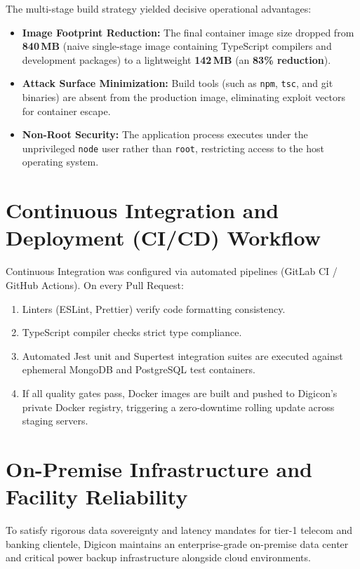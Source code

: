 The multi-stage build strategy yielded decisive operational advantages:
\begin{itemize}
    \item \textbf{Image Footprint Reduction:} The final container image size dropped from \textbf{840\,MB} (naive single-stage image containing TypeScript compilers and development packages) to a lightweight \textbf{142\,MB} (an \textbf{83\% reduction}).
    \item \textbf{Attack Surface Minimization:} Build tools (such as \texttt{npm}, \texttt{tsc}, and git binaries) are absent from the production image, eliminating exploit vectors for container escape.
    \item \textbf{Non-Root Security:} The application process executes under the unprivileged \texttt{node} user rather than \texttt{root}, restricting access to the host operating system.
\end{itemize}

\section{Continuous Integration and Deployment (CI/CD) Workflow}
\label{sec:test_cicd}

Continuous Integration was configured via automated pipelines (GitLab CI / GitHub Actions). On every Pull Request:
\begin{enumerate}
    \item Linters (ESLint, Prettier) verify code formatting consistency.
    \item TypeScript compiler checks strict type compliance.
    \item Automated Jest unit and Supertest integration suites are executed against ephemeral MongoDB and PostgreSQL test containers.
    \item If all quality gates pass, Docker images are built and pushed to Digicon's private Docker registry, triggering a zero-downtime rolling update across staging servers.
\end{enumerate}

\section{On-Premise Infrastructure and Facility Reliability}
\label{sec:test_datacenter}

To satisfy rigorous data sovereignty and latency mandates for tier-1 telecom and banking clientele, Digicon maintains an enterprise-grade on-premise data center and critical power backup infrastructure alongside cloud environments. 

